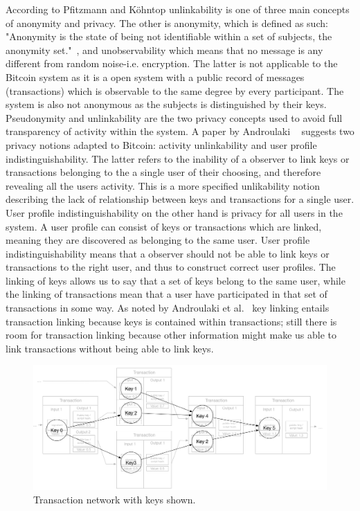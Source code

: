 According to Pfitzmann and Köhntop unlinkability is one of three main concepts of anonymity and privacy. The other is anonymity, which is defined as such: "Anonymity is the state of being not identifiable within a set of subjects, the anonymity set."~\cite{pfitzmann2001anonymity}, and unobservability which means that no message is any different from random noise-i.e. encryption. The latter is not applicable to the Bitcoin system as it is a open system with a public record of messages (transactions) which is observable to the same degree by every participant. The system is also not anonymous as the subjects is distinguished by their keys.
\\

Pseudonymity and unlinkability are the two privacy concepts used to avoid full transparency of activity within the system. A paper by Androulaki ~\cite{androulaki2013evaluating} suggests two privacy notions adapted to Bitcoin: activity unlinkability and user profile indistinguishability. The latter refers to the inability of a observer to link keys or transactions belonging to the a single user of their choosing, and therefore revealing all the users activity. This is a more specified unlikability notion describing the lack of relationship between keys and transactions for a single user. User profile indistinguishability on the other hand is privacy for all users in the system. A user profile can consist of keys or transactions which are linked, meaning they are discovered as belonging to the same user. User profile indistinguishability means that a observer should not be able to link keys or transactions to the right user, and thus to construct correct user profiles. The linking of keys allows us to say that a set of keys belong to the same user, while the linking of transactions mean that a user have participated in that set of transactions in some way. As noted by Androulaki et al.~\cite{androulaki2013evaluating} key linking entails transaction linking because keys is contained within transactions; still there is room for transaction linking because other information might make us able to link transactions without being able to link keys. 

\begin{figure}[ht]
    \centering
    \includegraphics[width=14cm]{figures/key_network_related.png}
    \caption{ Transaction network with keys shown.}
    \label{fig:transaction_graph_keys}
\end{figure}

